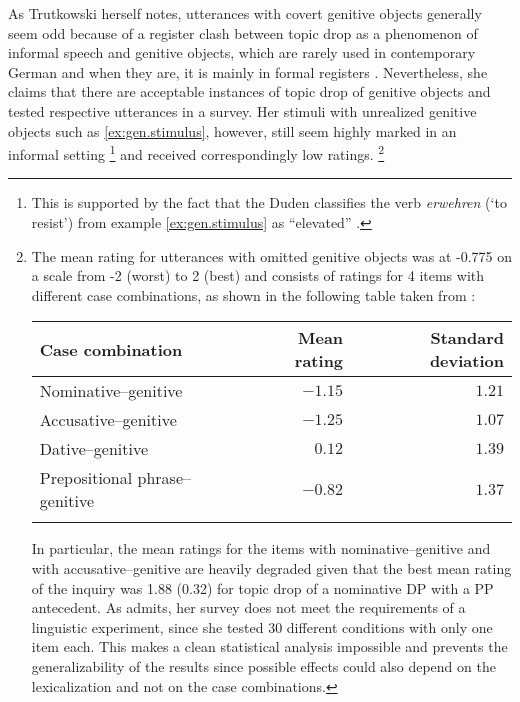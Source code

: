 As Trutkowski herself notes, utterances with covert genitive  objects generally seem odd because of a register clash between topic drop as a phenomenon of informal speech and genitive  objects, which are rarely used in contemporary German and when they are, it is mainly in formal registers \citep[26]{trutkowski2016}.
Nevertheless, she claims that there are acceptable instances of topic drop of genitive  objects and tested respective utterances in a survey. 
Her stimuli with unrealized genitive  objects such as \ref{ex:gen.stimulus}, however, still seem highly marked in an informal setting%
\footnote{This is supported by the fact that the Duden classifies the verb \textit{erwehren} (`to resist') from example \ref{ex:gen.stimulus} as ``elevated'' \citep{erwehren}.}
 and received correspondingly low ratings.%
\footnote{The mean rating for utterances with omitted genitive  objects was at -0.775 on a scale from -2 (worst) to 2 (best) and consists of ratings for 4 items with different case combinations, as shown in the following table taken from \citet[48]{trutkowski2016}:   
\begin{center}
\begin{tabular}{lrr}
\lsptoprule
Case combination & Mean rating & Standard deviation \\
\midrule
Nominative--genitive & $-1.15$ & $1.21$ \\
Accusative--genitive & $-1.25$ & $1.07$ \\
Dative--genitive & $0.12$ & $1.39$ \\
Prepositional phrase--genitive & $-0.82$ & $1.37$\\
\lspbottomrule
\end{tabular}
\end{center}

\noindent In particular, the mean ratings for the items with nominative--genitive and with accusative--genitive are heavily degraded given that the best mean rating of the inquiry was 1.88 (0.32) for topic drop of a nominative DP with a PP antecedent. 
As \citet[39]{trutkowski2016} admits, her survey does not meet the requirements of a linguistic experiment, since she tested 30 different conditions with only one item each.
This makes a clean statistical analysis impossible and prevents the generalizability of the results since possible effects could also depend on the lexicalization and not on the case combinations.
}

